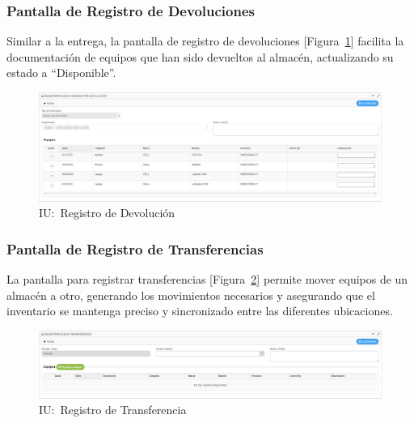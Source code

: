 \documentclass[stu, 12pt, letterpaper, donotrepeattitle, floatsintext, natbib]{apa7}
\begin{document}
\subsubsection{Pantalla de Registro de Devoluciones}
Similar a la entrega, la pantalla de registro de devoluciones [Figura~\ref{devolucion}] facilita la documentación de equipos que han sido
devueltos al almacén, actualizando su estado a ``Disponible''.
\begin{figure}[H]
    \centering
    \caption{IU:~Registro de Devolución}\label{devolucion}
    \includegraphics[width=16.5cm]{./images/devolucionEquipo.png}
\end{figure}
\subsubsection{Pantalla de Registro de Transferencias}
La pantalla para registrar transferencias [Figura~\ref{transferencia}] permite mover equipos de un almacén a otro, generando los movimientos
necesarios y asegurando que el inventario se mantenga preciso y sincronizado entre las diferentes ubicaciones.
\begin{figure}[H]
    \centering
    \caption{IU:~Registro de Transferencia}\label{transferencia}
    \includegraphics[width=16.5cm]{./images/transferencia.png}
\end{figure}
\end{document}

